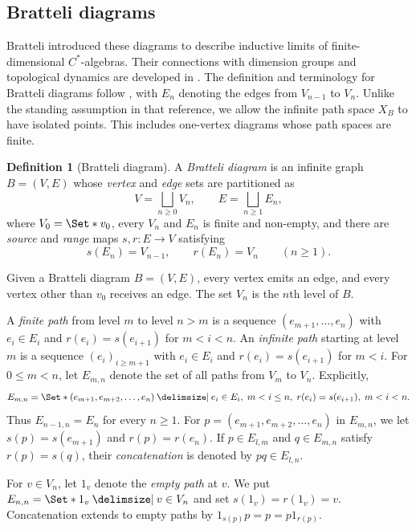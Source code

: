 \documentclass[11pt]{amsart}
\providecommand\given{}
\newcommand\SetSymbol[1][]{%
  \nonscript\:#1\vert\allowbreak\nonscript\:\mathopen{}%
}
\renewcommand\given{\SetSymbol[\delimsize]}#1%
\theoremstyle{definition}
\newtheorem{definition}[theorem]{Definition}
\theoremstyle{remark}
\begin{document}
\subsection{Bratteli diagrams}
\label{subsec:bratteli-diagrams}

Bratteli \cite{Bratteli1972} introduced these diagrams to describe
inductive limits of finite-dimensional $C^*$-algebras.  Their connections
with dimension groups and topological dynamics are developed in
\cite{HermanPutnamSkau1992}.
The definition and terminology for Bratteli diagrams follow
\cite[Section~2.2]{BezuglyiKarpel2016}, with $E_n$ denoting the edges
from $V_{n-1}$ to $V_n$.
Unlike the standing assumption in that reference, we allow the infinite
path space $X_B$ to have isolated points.  This includes one-vertex diagrams
whose path spaces are finite.

\begin{definition}[Bratteli diagram]\label{def:bratteli}
A \emph{Bratteli diagram} is an infinite graph $B=(V,E)$ whose \emph{vertex} and \emph{edge}
sets are partitioned as
\[
 V=\bigsqcup_{n\geq0}V_n,
 \qquad
 E=\bigsqcup_{n\geq1}E_n,
\]
where $V_0=\Set*{v_0}$, every $V_n$ and $E_n$ is finite and non-empty, and there
are \emph{source} and \emph{range} maps $s,r\colon E\to V$ satisfying
\[
 s(E_n)=V_{n-1},
 \qquad
 r(E_n)=V_n
 \qquad(n\geq1).
\]
\end{definition}

Given a Bratteli diagram \(B=(V,E)\), every vertex emits an edge, and every
vertex other than $v_0$ receives an edge.
The set $V_n$ is the $n$th level of $B$.

A \emph{finite path} from level $m$ to level $n>m$ is a sequence
$(e_{m+1},\ldots,e_n)$ with $e_i\in E_i$ and
$r(e_i)=s(e_{i+1})$ for $m<i<n$.
An \emph{infinite path} starting at level $m$ is a sequence
$(e_i)_{i\geq m+1}$ with $e_i\in E_i$ and
$r(e_i)=s(e_{i+1})$ for $m<i$.
For $0 \leq m < n$, let $E_{m,n}$ denote the set of all paths from
$V_m$ to $V_n$.
Explicitly,
\[
E_{m,n} = \Set*{(e_{m+1}, e_{m+2}, \dots, e_n) \given
e_i \in E_i, \; m < i \leq n, \;
r(e_i) = s(e_{i+1}), \; m < i < n}.
\]
Thus $E_{n-1,n}=E_n$ for every $n\geq1$.
For $p = (e_{m+1}, e_{m+2}, \dots, e_n)$ in $E_{m,n}$, we let $s(p) =
s(e_{m+1})$ and $r(p) = r(e_n)$.
If $p\in E_{l,m}$ and $q\in E_{m,n}$ satisfy $r(p)=s(q)$, their \emph{concatenation}
is denoted by $pq\in E_{l,n}$.

For $v\in V_n$, let $1_v$ denote the \emph{empty path} at $v$.
We put $E_{n,n}=\Set*{1_v \given v\in V_n}$ and set
$s(1_v)=r(1_v)=v$.  Concatenation extends to empty paths by
$1_{s(p)}p=p=p1_{r(p)}$.
\end{document}
